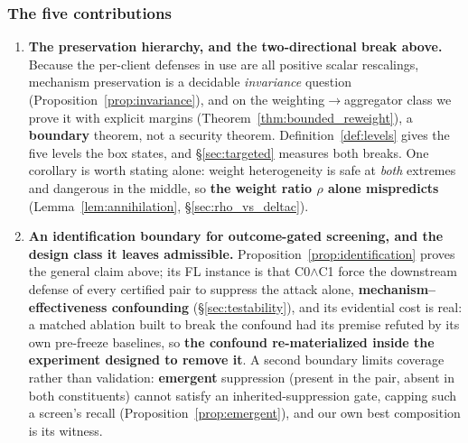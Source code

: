 \documentclass{article}
\begin{document}
\subsubsection{The five contributions}

\begin{enumerate}[leftmargin=*,itemsep=2pt]
\item \textbf{The preservation hierarchy, and the two-directional break above.} Because the per-client defenses in use are all positive scalar rescalings, mechanism preservation is a decidable \emph{invariance} question (Proposition~\ref{prop:invariance}), and on the weighting$\to$aggregator class we prove it with explicit margins (Theorem~\ref{thm:bounded_reweight}), a \textbf{boundary} theorem, not a security theorem. Definition~\ref{def:levels} gives the five levels the box states, and \S\ref{sec:targeted} measures both breaks. One corollary is worth stating alone: weight heterogeneity is safe at \emph{both} extremes and dangerous in the middle, so \textbf{the weight ratio $\rho$ alone mispredicts} (Lemma~\ref{lem:annihilation}, \S\ref{sec:rho_vs_deltac}).

\item \textbf{An identification boundary for outcome-gated screening, and the design class it leaves admissible.} Proposition~\ref{prop:identification} proves the general claim above; its FL instance is that C0$\wedge$C1 force the downstream defense of every certified pair to suppress the attack alone, \textbf{mechanism--effectiveness confounding} (\S\ref{sec:testability}), and its evidential cost is real: a matched ablation built to break the confound had its premise refuted by its own pre-freeze baselines, so \textbf{the confound re-materialized inside the experiment designed to remove it}. A second boundary limits coverage rather than validation: \textbf{emergent} suppression (present in the pair, absent in both constituents) cannot satisfy an inherited-suppression gate, capping such a screen's recall (Proposition~\ref{prop:emergent}), and our own best composition is its witness.


\end{enumerate}
\end{document}

